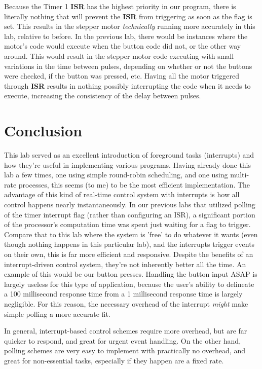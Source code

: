 \documentclass[a4paper, 12pt]{article}
\begin{document}
Because the Timer 1 \textbf{ISR} has the highest priority in our program, there is literally nothing that will prevent the \textbf{ISR} from triggering as soon as the flag is set. This results in the stepper motor \textit{technically} running more accurately in this lab, relative to before. In the previous lab, there would be instances where the motor's code would execute when the button code did not, or the other way around. This would result in the stepper motor code executing with small variations in the time between pulses, depending on whether or not the buttons were checked, if the button was pressed, etc. Having all the motor triggered through \textbf{ISR} results in nothing possibly interrupting the code when it needs to execute, increasing the consistency of the delay between pulses.

\section{Conclusion}
This lab served as an excellent introduction of foreground tasks (interrupts) and how they're useful in implementing various programs. Having already done this lab a few times, one using simple round-robin scheduling, and one using multi-rate processes, this seems (to me) to be the most efficient implementation. The advantage of this kind of real-time control system with interrupts is how all control happens nearly instantaneously. In our previous labs that utilized polling of the timer interrupt flag (rather than configuring an ISR), a significant portion of the processor's computation time was spent just waiting for a flag to trigger. Compare that to this lab where the system is 'free' to do whatever it wants (even though nothing happens in this particular lab), and the interrupts trigger events on their own, this is far more efficient and responsive. Despite the benefits of an interrupt-driven control system, they're not inherently better all the time. An example of this would be our button presses. Handling the button input ASAP is largely useless for this type of application, because the user's ability to delineate a 100 millisecond response time from a 1 millisecond response time is largely negligible. For this reason, the necessary overhead of the interrupt \textit{might} make simple polling a more accurate fit.

In general, interrupt-based control schemes require more overhead, but are far quicker to respond, and great for urgent event handling. On the other hand, polling schemes are very easy to implement with practically no overhead, and great for non-essential tasks, especially if they happen are a fixed rate.
\end{document}
